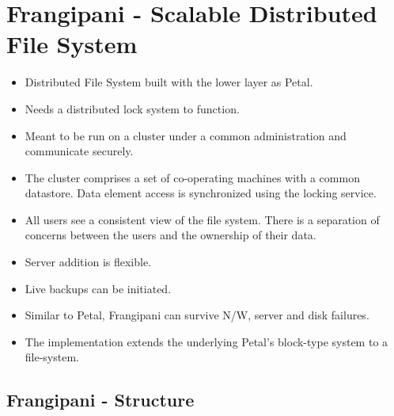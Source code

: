 \documentclass[parskip=half]{scrartcl}
\begin{document}



\newpage


\section{Frangipani - Scalable Distributed File System} %
\label{sec:frangipani_scalable_distributed_file_system}

    \begin{itemize}
        \item 
        Distributed File System built with the lower layer as Petal.
        \item 
        Needs a distributed lock system to function.
        \item 
        Meant to be run on a cluster under a common administration and communicate securely.
        \item 
        The cluster comprises a set of co-operating machines with a common datastore. Data element access is synchronized using the locking service.
        \item 
        All users see a consistent view of the file system. There is a separation of concerns between the users and the ownership of their data.
        \item 
        Server addition is flexible.
        \item 
        Live backups can be initiated.
        \item 
        Similar to Petal, Frangipani can survive N/W, server and disk failures.
        \item 
        The implementation extends the underlying Petal's block-type system to a file-system.
    \end{itemize}

    \subsection{Frangipani - Structure} %
    \label{sub:frangipani_structure}
    
\end{document}
